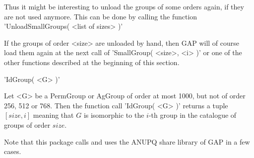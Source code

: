 Thus it might be interesting to  unload the groups of some orders again, if
they  are  not  used  anymore.  This  can  be  done by calling the function 
'UnloadSmallGroups( <list of sizes> )'

If the groups of order <size> are unloaded by hand, then GAP will of course
load them again at the next call of  'SmallGroup( <size>, <i> )'  or one of
the other functions described at the beginning of this section.

\vspace{5mm}
'IdGroup( <G> )'%

Let <G> be a PermGroup or AgGroup of order at most 1000, but not  of  order
256, 512 or 768. Then the  function call  'IdGroup( <G> )'  returns a tuple
$[size, i]$  meaning  that  $G$  is  isomorphic  to the $i$-th group in the
catalogue of groups of order $size$.

Note that  this package calls and  uses the ANUPQ share library of GAP in a
few cases.

